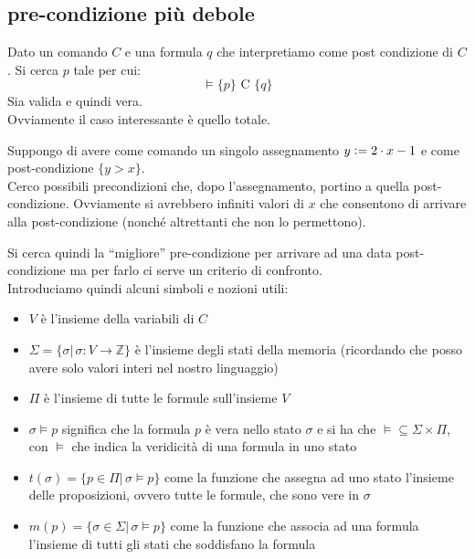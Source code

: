 				      				\subsection{pre-condizione più debole}
				      				Dato un comando $C$ e una formula $q$ che interpretiamo come post condizione di
				      				$C$. Si cerca $p$ tale per cui:
				      				\[\vDash\{p\}\mbox{ C } \{q\}\]
				      				Sia valida e quindi vera.\\
				      				Ovviamente il caso interessante è quello totale.
				      				\begin{esempio}
				      					Suppongo di avere come comando un singolo assegnamento $y\cceq 2\cdot x-1$ e
				      					come post-condizione $\{y>x\}$.\\
				      					Cerco possibili precondizioni che, dopo l'assegnamento, portino a quella
				      					post-condizione. Ovviamente si avrebbero infiniti valori di $x$ che consentono
				      					di arrivare alla post-condizione (nonché altrettanti che non lo permettono). 
				      				\end{esempio}
				      				Si cerca quindi la ``migliore'' pre-condizione per arrivare ad una data
				      				post-condizione ma per farlo ci serve un criterio di confronto. \\
				      				Introduciamo quindi alcuni simboli e nozioni utili:
				      				\begin{itemize}
				      					\item $V$ è l'insieme della variabili di $C$
				      					\item $\Sigma=\{\sigma|\,\sigma:V\to\mathbb{Z}\}$ è l'insieme degli stati
				      					      della memoria (ricordando che posso avere solo valori interi nel nostro
				      					      linguaggio)
				      					\item $\Pi$ è l'insieme di tutte le formule sull'insieme $V$
				      					\item $\sigma \vDash p$ significa che la formula $p$ è vera nello stato
				      					      $\sigma$ e si ha che $\vDash\subseteq\Sigma\times \Pi$, con $\vDash$ che
				      					      indica la veridicità di una formula in uno stato
				      					\item $t(\sigma)=\{p\in \Pi|\,\sigma\vDash p\}$ come la funzione che assegna
				      					      ad uno stato l'insieme delle proposizioni, ovvero tutte le formule, che sono
				      					      vere in $\sigma$
				      					\item $m(p)=\{\sigma\in \Sigma|\,\sigma\vDash p\}$ come la funzione che
				      					      associa ad una formula l'insieme di tutti gli stati che soddisfano la formula
				      				\end{itemize}
